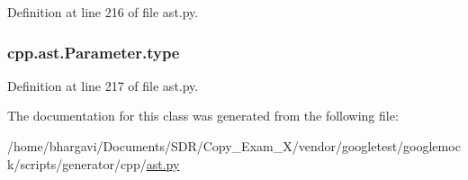 Definition at line 216 of file ast.\+py.

\subsubsection[{\texorpdfstring{type}{type}}]{\setlength{\rightskip}{0pt plus 5cm}cpp.\+ast.\+Parameter.\+type}\hypertarget{classcpp_1_1ast_1_1_parameter_a5eed090000c41551a10c21f175ad33e3}{}\label{classcpp_1_1ast_1_1_parameter_a5eed090000c41551a10c21f175ad33e3}


Definition at line 217 of file ast.\+py.



The documentation for this class was generated from the following file\+:\begin{DoxyCompactItemize}
\item 
/home/bhargavi/\+Documents/\+S\+D\+R/\+Copy\+\_\+\+Exam\+\_\+X/vendor/googletest/googlemock/scripts/generator/cpp/\hyperlink{ast_8py}{ast.\+py}\end{DoxyCompactItemize}

